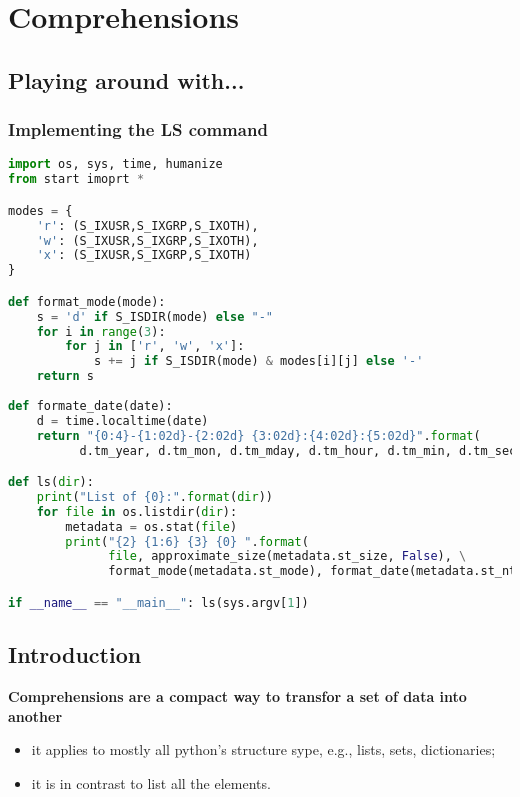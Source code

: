 \section{Comprehensions}

\subsection{Playing around with...}

\subsubsection{Implementing the LS command}

\begin{lstlisting}[language=Python]
import os, sys, time, humanize
from start imoprt *

modes = { 
	'r': (S_IXUSR,S_IXGRP,S_IXOTH), 
	'w': (S_IXUSR,S_IXGRP,S_IXOTH), 
	'x': (S_IXUSR,S_IXGRP,S_IXOTH)
}

def format_mode(mode):
	s = 'd' if S_ISDIR(mode) else "-"
	for i in range(3):
		for j in ['r', 'w', 'x']:
			s += j if S_ISDIR(mode) & modes[i][j] else '-'
	return s
	
def formate_date(date):
	d = time.localtime(date)
	return "{0:4}-{1:02d}-{2:02d} {3:02d}:{4:02d}:{5:02d}".format(
          d.tm_year, d.tm_mon, d.tm_mday, d.tm_hour, d.tm_min, d.tm_sec)

def ls(dir):
	print("List of {0}:".format(dir))
	for file in os.listdir(dir):
		metadata = os.stat(file)
		print("{2} {1:6} {3} {0} ".format(
		      file, approximate_size(metadata.st_size, False), \
		      format_mode(metadata.st_mode), format_date(metadata.st_ntime)))

if __name__ == "__main__": ls(sys.argv[1])
\end{lstlisting}

\subsection{Introduction}
\textbf{Comprehensions are a compact way to transfor a set of data into another}
\begin{itemize}
	\item it applies to mostly all python's structure sype, e.g., lists, sets, dictionaries;
	\item it is in contrast to list all the elements.
\end{itemize}

